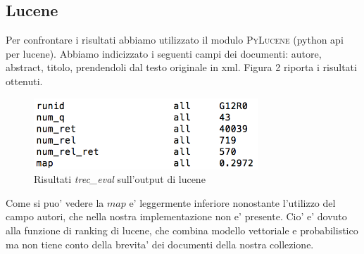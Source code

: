 \documentclass[12pt]{article}
\begin{document}
\subsection{Lucene}
Per confrontare i risultati abbiamo utilizzato il modulo \textsc{PyLucene} (python api per lucene). Abbiamo indicizzato i seguenti campi dei documenti: autore, abstract, titolo, prendendoli dal testo originale in xml. Figura 2 riporta i risultati ottenuti.
\begin{figure}[htbp]
\begin{center}
\includegraphics[width=0.75\textwidth]{result2.png}
\caption{Risultati \textit{trec\_eval} sull'output di lucene}
\label{fig:fig2}
\end{center}
\end{figure}



Come si puo' vedere la $map$ e' leggermente inferiore nonostante l'utilizzo del campo autori, che nella nostra implementazione non e' presente. Cio' e' dovuto alla funzione di ranking di lucene, che combina modello vettoriale e probabilistico ma non tiene conto della brevita' dei documenti della nostra collezione.
\end{document}
